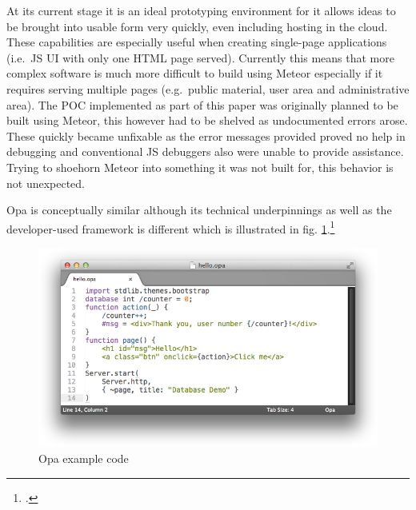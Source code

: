 \begin{appendices}
\begin{subappendices}
At its current stage it is an ideal prototyping environment for it allows ideas to be brought into usable form very quickly, even including hosting in the cloud. These capabilities are especially useful when creating single-page applications (i.e.\ JS UI with only one HTML page served). Currently this means that more complex software is much more difficult to build using Meteor especially if it requires serving multiple pages (e.g.\ public material, user area and administrative area). The POC implemented as part of this paper was originally planned to be built using Meteor, this however had to be shelved as undocumented errors arose. These quickly became unfixable as the error messages provided proved no help in debugging and conventional JS debuggers also were unable to provide assistance.
Trying to shoehorn Meteor into something it was not built for, this behavior is not unexpected.

Opa is conceptually similar although its technical underpinnings as well as the developer-used framework is different which is illustrated in fig. \ref{img:opa}.\footcite{opa}

\begin{figure}[hbtp]
\centering
\includegraphics[scale=0.5]{img/hello-opa-write}
\caption{Opa example code \label{img:opa}}
\end{figure}




\FloatBarrier


\end{subappendices}
\end{appendices}

